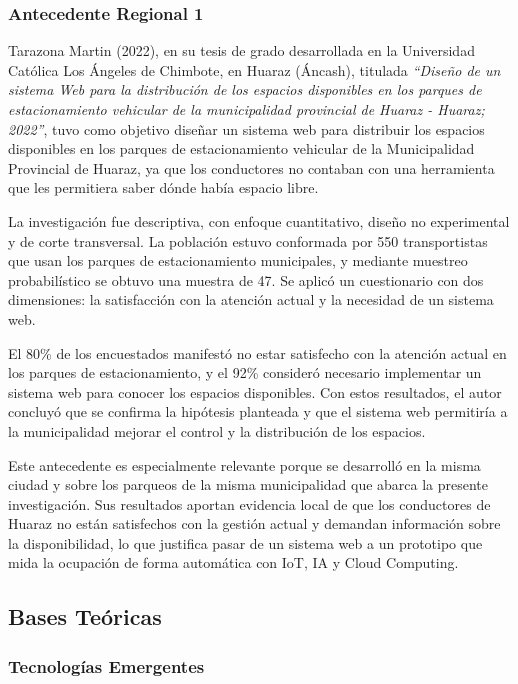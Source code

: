 \documentclass[12pt,a4paper]{article}
\begin{document}
\subsubsection{Antecedente Regional 1}

Tarazona Martin (2022), en su tesis de grado desarrollada en la Universidad Católica Los Ángeles de Chimbote, en Huaraz (Áncash), titulada \textit{``Diseño de un sistema Web para la distribución de los espacios disponibles en los parques de estacionamiento vehicular de la municipalidad provincial de Huaraz - Huaraz; 2022''}, tuvo como objetivo diseñar un sistema web para distribuir los espacios disponibles en los parques de estacionamiento vehicular de la Municipalidad Provincial de Huaraz, ya que los conductores no contaban con una herramienta que les permitiera saber dónde había espacio libre.

La investigación fue descriptiva, con enfoque cuantitativo, diseño no experimental y de corte transversal. La población estuvo conformada por 550 transportistas que usan los parques de estacionamiento municipales, y mediante muestreo probabilístico se obtuvo una muestra de 47. Se aplicó un cuestionario con dos dimensiones: la satisfacción con la atención actual y la necesidad de un sistema web.

El 80\% de los encuestados manifestó no estar satisfecho con la atención actual en los parques de estacionamiento, y el 92\% consideró necesario implementar un sistema web para conocer los espacios disponibles. Con estos resultados, el autor concluyó que se confirma la hipótesis planteada y que el sistema web permitiría a la municipalidad mejorar el control y la distribución de los espacios.

Este antecedente es especialmente relevante porque se desarrolló en la misma ciudad y sobre los parqueos de la misma municipalidad que abarca la presente investigación. Sus resultados aportan evidencia local de que los conductores de Huaraz no están satisfechos con la gestión actual y demandan información sobre la disponibilidad, lo que justifica pasar de un sistema web a un prototipo que mida la ocupación de forma automática con IoT, IA y Cloud Computing.

\subsection{Bases Teóricas}

\subsubsection{Tecnologías Emergentes}
\end{document}
